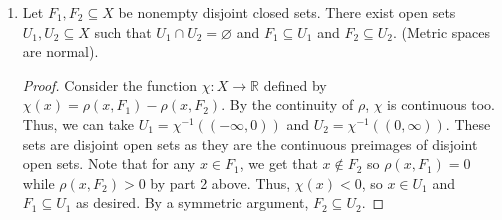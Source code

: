 \documentclass[12pt]{article}
\begin{document}
\begin{enumerate}
\begin{proof}
    ($\impliedby$) Let $x \not\in F$, and let $\varepsilon$ be such that $0 < \varepsilon < \rho(x, F)$. Consider any point $y \in B(x, \varepsilon)$, and assume for contradiction that $y \in F$. Then, $\rho(x, F) \le d(y, x) < \varepsilon$, contradicting $\varepsilon < \rho(x, F)$. Thus, we get $B(x, \varepsilon) \cap F = \varnothing$, so $F^C$ is open and $F$ is closed.
\end{proof}

\item Let $F_1, F_2 \subseteq X$ be nonempty disjoint closed sets. There exist open sets $U_1, U_2 \subseteq X$ such that $U_1 \cap U_2 = \varnothing$ and $F_1 \subseteq U_1$ and $F_2 \subseteq U_2$. (Metric spaces are normal).
\begin{proof}
    Consider the function $\chi : X \to \mathbb R$ defined by $\chi(x) = \rho(x, F_1) - \rho(x, F_2)$. By the continuity of $\rho$, $\chi$ is continuous too. Thus, we can take $U_1 = \chi^{-1}((-\infty, 0))$ and $U_2 = \chi^{-1}((0, \infty))$. These sets are disjoint open sets as they are the continuous preimages of disjoint open sets. Note that for any $x \in F_1$, we get that $x \not\in F_2$ so $\rho(x, F_1) = 0$ while $\rho(x, F_2) > 0$ by part 2 above. Thus, $\chi(x) < 0$, so $x \in U_1$ and $F_1 \subseteq U_1$ as desired. By a symmetric argument, $F_2 \subseteq U_2$. 
\end{proof}

\end{enumerate}
\end{document}
